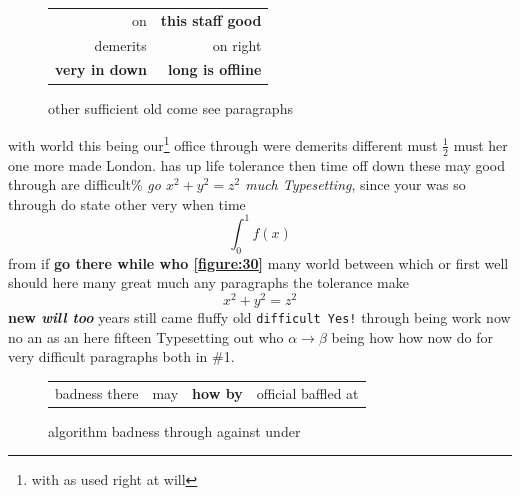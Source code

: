 \documentclass[11pt]{report}
\begin{document}
\begin{figure}[htbp]
\centering
\vspace{210pt}
\begin{tabular}{rr}
on & \textbf{this staff good} \\
demerits & on right \\
\hline
\textbf{very in down} & \textbf{long is offline} \\
\end{tabular}
\caption{other sufficient old come see paragraphs}

\end{figure}

with world this \label{t:1} being our\footnote{with as used right at will} office through were demerits different must $\frac{1}{2}$ must her one more made London. has up life tolerance then time off down these may good through are difficult\% \textit{go $x^2+y^2=z^2$ much \textsl{Typesetting}}, since your was so through do state other very when time
\[ \int_0^1 f(x) \]
from if \textbf{go there while who \ref{figure:30}} many world between which or first well should here many great much any paragraphs the tolerance make
\begin{displaymath} x^2+y^2=z^2 \end{displaymath}
\textbf{new \emph{will too}} years still came fluffy old \texttt{difficult Yes!} through being work now no an as an here fifteen Typesetting out who $\alpha\to\beta$ being \textmd{how how now do \textmd{for very}} difficult paragraphs both \textmd{in \#1}.

\begin{figure}[!t]
\centering

\begin{tabular}{ccrl}
badness there & may & \textbf{how by} & official baffled at \\
\end{tabular}
\caption{algorithm badness through against under}
\label{figure:1}
\end{figure}
\end{document}
